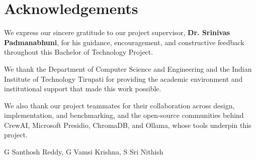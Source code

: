 \documentclass[11pt,a4paper]{article}
\begin{document}
\begin{abstract}
\vspace{0.6em}
\noindent
\textbf{Keywords:} Multi-Agent Systems, Indirect Prompt Injection, Privacy Guardrails, PII Redaction, Zero-Trust Architecture, DEPA, DPDP Act India, Small Language Models, Adversarial Red Teaming.
\end{abstract}

\clearpage
\section*{Acknowledgements}

We express our sincere gratitude to our project supervisor, \textbf{Dr. Srinivas Padmanabhuni}, for his guidance, encouragement, and constructive feedback throughout this Bachelor of Technology Project.

We thank the Department of Computer Science and Engineering and the Indian Institute of Technology Tirupati for providing the academic environment and institutional support that made this work possible.

We also thank our project teammates for their collaboration across design, implementation, and benchmarking, and the open-source communities behind CrewAI, Microsoft Presidio, ChromaDB, and Ollama, whose tools underpin this project.

\vspace{2em}
\hfill G Santhosh Reddy, G Vamsi Krishna, S Sri Nithish

\clearpage
\tableofcontents
\clearpage
\listoffigures
\listoftables

\clearpage
\end{document}
